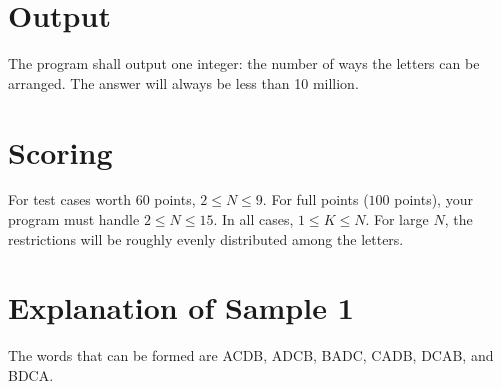 \section*{Output}

The program shall output one integer: the number of ways the letters can
be arranged. The answer will always be less than 10 million.

\section*{Scoring}

For test cases worth $60$ points, $2\le N\le 9$. For full
points ($100$ points), your program must handle $2\le N\le 15$. In all cases, $1\le K\le N$.
For large $N$, the restrictions will be roughly evenly distributed among
the letters.

\section*{Explanation of Sample 1}

The words that can be formed are ACDB, ADCB, BADC, CADB,
DCAB, and BDCA.

